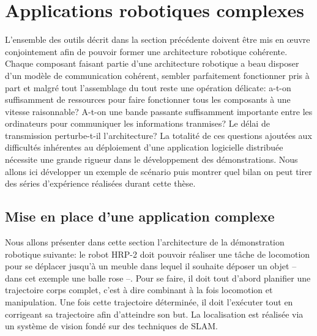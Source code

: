 \section{Applications robotiques complexes}


L'ensemble des outils décrit dans la section précédente doivent être
mis en \oe uvre conjointement afin de pouvoir former une architecture
robotique cohérente. Chaque composant faisant partie d'une
architecture robotique a beau disposer d'un modèle de communication
cohérent, sembler parfaitement fonctionner pris à part et malgré tout
l'assemblage du tout reste une opération délicate: a-t-on suffisamment
de ressources pour faire fonctionner tous les composants à une vitesse
raisonnable? A-t-on une bande passante suffisamment importante entre
les ordinateurs pour communiquer les informations tranmises? Le délai
de transmission perturbe-t-il l'architecture? La totalité de ces
questions ajoutées aux difficultés inhérentes au déploiement d'une
application logicielle distribuée nécessite une grande rigueur dans le
développement des démonstrations. Nous allons ici développer un
exemple de scénario puis montrer quel bilan on peut tirer des séries
d'expérience réalisées durant cette thèse.


\subsection{Mise en place d'une application complexe}


Nous allons présenter dans cette section l'architecture de la
démonstration robotique suivante: le robot HRP-2 doit pouvoir réaliser
une tâche de locomotion pour se déplacer jusqu'à un meuble dans lequel
il souhaite déposer un objet -- dans cet exemple une balle rose
--. Pour se faire, il doit tout d'abord planifier une trajectoire
corps complet, c'est à dire combinant à la fois locomotion et
manipulation. Une fois cette trajectoire déterminée, il doit
l'exécuter tout en corrigeant sa trajectoire afin d'atteindre son
but. La localisation est réalisée via un système de vision fondé sur
des techniques de SLAM.

